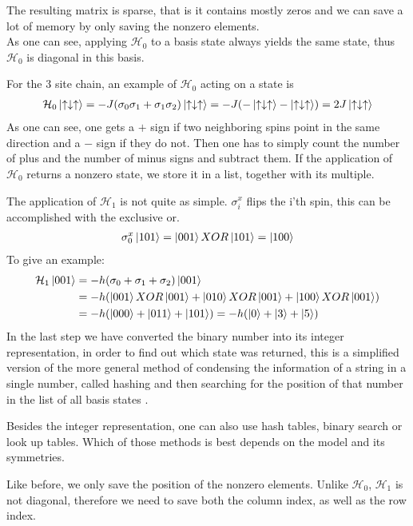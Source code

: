 \documentclass[a4paper,12pt]{article}
\begin{document}
The resulting matrix is sparse, that is it contains mostly zeros and we can save a lot of memory by only saving the nonzero elements.\\
As one can see, applying $\mathcal{H}_0$ to a basis state always
yields the same state, thus $\mathcal{H}_0$ is diagonal in this basis.

For the 3 site chain, an example of $\mathcal{H}_0$ acting on a state is
\begin{align*}
\mathcal{H}_0 \ket{\uparrow \downarrow \uparrow} = -J(\sigma_0\sigma_1 + \sigma_1\sigma_2) \ket{\uparrow \downarrow \uparrow} = -J(-\ket{\uparrow \downarrow \uparrow} - \ket{\uparrow \downarrow \uparrow}) = 2J \ket{\uparrow \downarrow \uparrow}
\end{align*}
As one can see, one gets a $+$ sign if two neighboring spins point in the same direction and a $-$ sign if they do not. Then one has to simply count the number of plus and the number of minus signs and subtract them.
If the application of $\mathcal{H}_0$ returns a nonzero state, we
store it in a list, together with its multiple.

The application of $\mathcal{H}_1$  is not quite as simple. $\sigma_i^x$ flips the i'th spin, this can be accomplished with the exclusive or.
\begin{align*}
\sigma_0^x \ket{101} = \ket{001} XOR \ket{101} = \ket{100}
\end{align*}
To give an example:
\begin{align*}
\mathcal{H}_1 \ket{001} &= -h(\sigma_0 + \sigma_1 + \sigma_2)\ket{001} \\
&= -h(\ket{001}XOR \ket{001} + \ket{010}XOR \ket{001} + \ket{100}XOR \ket{001})\\
&= -h(\ket{000} +\ket{011} +\ket{101}) = -h(\ket{0} + \ket{3} +\ket{5})
\end{align*}
In the last step we have converted the binary number into its integer
representation, in order to find out which state was returned, this is
a simplified version of the more general method of condensing the
information of a string in a single number, called hashing and then searching for the
position of that number in the list of all basis states \cite{Zhang}.

Besides the integer representation, one can also use hash tables,
binary search or look up tables. Which of those methods is best
depends on the model and its symmetries.

Like before, we only save the position of the nonzero elements. Unlike
$\mathcal{H}_0$, $\mathcal{H}_1$ is not diagonal, therefore we need to
save both the column index, as well as the row index.
\end{document}
